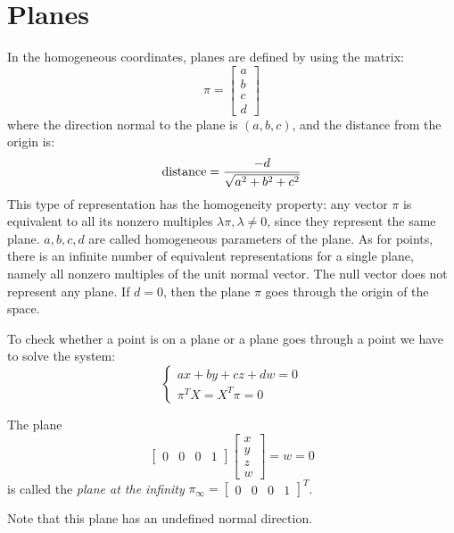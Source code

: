 \documentclass[12pt, a4paper]{report}
\begin{document}
    \section{Planes}
    In the homogeneous coordinates, planes are defined by using the matrix: 
    \[\pi=\begin{bmatrix} a \\ b \\c \\d \end{bmatrix}\]
    where the direction normal to the plane is $(a,b,c)$, and the distance from the origin is: 
    \[\textnormal{distance}=\dfrac{-d}{\sqrt{a^2+b^2+c^2}}\]
    This type of representation has the homogeneity property: any vector $\pi$ is equivalent to all its nonzero multiples $\lambda \pi, \lambda \neq 0$, since they 
    represent the same plane. $a,b,c,d$ are called  homogeneous parameters of the plane. As for points, there is an infinite number of equivalent representations 
    for a single plane, namely all nonzero multiples of the unit normal vector. The null vector does not represent any plane. If $d=0$, then the plane $\pi$ goes through 
    the origin of the space. 

    To check whether a point is on a plane or a plane goes through a point we have to solve the system: 
    \[
    \begin{cases}
        ax+by+cz+dw=0 \\
        \pi^TX=X^T\pi=0
    \end{cases}
    \]

    \begin{definition}
        The plane \[\begin{bmatrix} 0 & 0 & 0 & 1 \end{bmatrix} \begin{bmatrix} x \\ y \\ z \\ w \end{bmatrix}=w=0\] is called the \emph{plane at the infinity} $\pi_{\infty}={\begin{bmatrix} 0 & 0 & 0 & 1 \end{bmatrix}}^T$. 
    \end{definition}
    Note that this plane has an undefined normal direction. 
\end{document}
